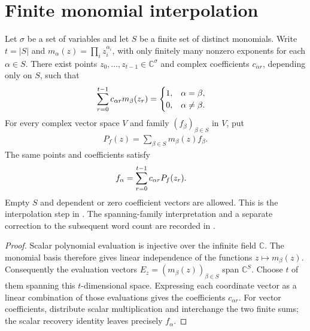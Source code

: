 \section{Finite monomial interpolation}

\begin{theorem}
    \label{thm:finite_monomial_interpolation}
    \leanok
    Let $\sigma$ be a set of variables and let $S$ be a finite set of distinct
    monomials. Write $t=|S|$ and $m_\alpha(z)=\prod_i z_i^{\alpha_i}$,
    with only finitely many nonzero exponents for each $\alpha\in S$.
    There exist points $z_0,\ldots,z_{t-1}\in\mathbb C^\sigma$ and complex
    coefficients $c_{\alpha r}$, depending only on $S$, such that
    \begin{align}
        \sum_{r=0}^{t-1}c_{\alpha r}m_\beta(z_r)
         & =\begin{cases}1,&\alpha=\beta,\\0,&\alpha\ne\beta.\end{cases}\notag
    \end{align}
    For every complex vector space $V$ and family $(f_\beta)_{\beta\in S}$ in $V$,
    put
    \begin{align*}
        P_f(z)=\sum_{\beta\in S}m_\beta(z)f_\beta.
    \end{align*}
    The same points and coefficients satisfy
    \begin{align}
        f_\alpha & =\sum_{r=0}^{t-1}c_{\alpha r}P_f(z_r).\notag
    \end{align}
    Empty $S$ and dependent or zero coefficient vectors are allowed.
    This is the interpolation step in \cite[Lemma~4.2]{Arad2013AreaLaw}.
    The spanning-family interpretation and a separate correction to the
    subsequent word count are recorded in
    \cite{gap:aklv13_interpolation_and_word_count}.
\end{theorem}
\begin{proof}\leanok
    Scalar polynomial evaluation is injective over the infinite field
    $\mathbb C$. The monomial basis therefore gives linear independence of
    the functions $z\mapsto m_\beta(z)$.
    Consequently the evaluation vectors
    $E_z=(m_\beta(z))_{\beta\in S}$ span $\mathbb C^S$.
    Choose $t$ of them spanning this $t$-dimensional space.
    Expressing each coordinate vector as a linear combination of those
    evaluations gives the coefficients $c_{\alpha r}$.
    For vector coefficients, distribute scalar multiplication and interchange
    the two finite sums; the scalar recovery identity leaves precisely $f_\alpha$.
\end{proof}


